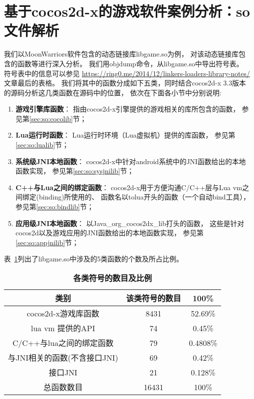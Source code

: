 \section{基于cocos2d-x的游戏软件案例分析：so文件解析}
\label{soanalysis}
我们以MoonWarriors软件包含的动态链接库libgame.so为例，
对该动态链接库包含的函数等进行深入分析。
我们用objdump命令，从libgame.so中导出符号表。
符号表中的信息可以参见
\url{https://ring0.me/2014/12/linkers-loaders-library-notes/}文章最后的表格。
我们将其中的函数分成如下五类，同时结合cocos2d-x 3.3版本的源码分析这几类函数在源码中的位置，
依次在下面各小节中分别说明:
\begin{enumerate}
\item \textbf{游戏引擎库函数}：
	指由cocos2d-x引擎提供的游戏相关的库所包含的函数，
	参见第\ref{sec:so:cocolib}节；
\item \textbf{Lua运行时函数}：
	Lua运行时环境（Lua虚拟机）提供的库函数，
	参见第\ref{sec:so:lualib}节；
\item \textbf{系统级JNI本地函数}：
	cocos2d-x中针对android系统中的JNI函数给出的本地函数实现，
	参见第\ref{sec:so:sysjnilib}节；
\item \textbf{C++与Lua之间的绑定函数}：
	cocos2d-x用于方便沟通C/C++层与Lua vm之间绑定(binding)所使用的、
	函数名以tolua开头的函数（一个自动bind工具），
	参见第\ref{sec:so:bindlib}节；
\item \textbf{应用级JNI本地函数}：
	以Java\_org\_cocos2dx\_lib打头的函数，
	这些是针对cocos2d以及游戏应用的JNI函数给出的本地函数实现，
	参见第\ref{sec:so:appjnilib}节；
\end{enumerate}

表~\ref{table:so:fun}列出了libgame.so中涉及的5类函数的个数及所占比例。
\begin{table}[H]
\begin{center}
\caption{\textbf{各类符号的数目及比例}}
\label{table:so:fun}
\begin{tabular}{|c|c|c|}
\hline 类别 & 该类符号的数目 & 100\% \\
\hline cocos2d-x游戏库函数& 8431 & 52.69\%  \\
\hline  lua vm 提供的API & 74 & 0.45\% \\
\hline C/C++与lua之间的绑定函数 & 79 &  0.4808\% \\
\hline 与JNI相关的函数(不含接口JNI) & 69 & 0.42\%\\
\hline 接口JNI & 21 & 0.128\%\\
\hline 总函数数目 & 16431 & 100\%  \\
\hline
\end{tabular}
\end{center}
\end{table}

